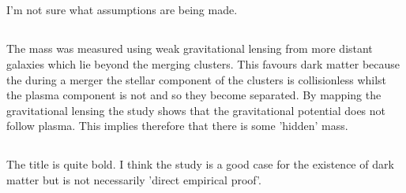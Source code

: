 \documentclass[a4paper,12pt]{article}
\begin{document}
\subsection{}
I'm not sure what assumptions are being made.
\subsection{}
The mass was measured using weak gravitational lensing from more distant galaxies which lie beyond the merging clusters. This favours dark matter because the during a merger the stellar component of the 
clusters is collisionless whilst the plasma component is not and so they become separated. By mapping the gravitational lensing the study shows that the gravitational potential does not follow
plasma. This implies therefore that there is some 'hidden' mass.
\subsection{}
The title is quite bold. I think the study is a good case for the existence of dark matter but is not necessarily 'direct empirical proof'.
\end{document}
